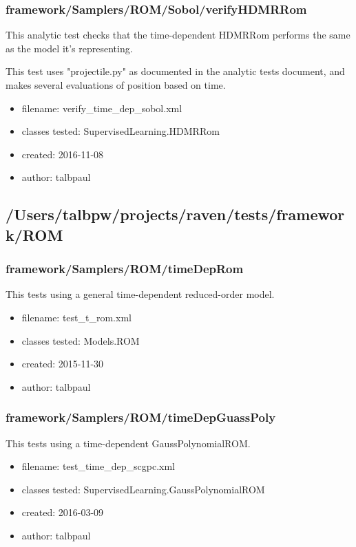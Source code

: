     \subsubsection{framework/Samplers/ROM/Sobol/verifyHDMRRom}
      
      This analytic test checks that the time-dependent HDMRRom performs the same as the model it's representing.
    

      
      This test uses "projectile.py" as documented in the analytic tests document, and makes several evaluations
      of position based on time.
    
      \begin{itemize}
          \item filename: verify\_time\_dep\_sobol.xml
          \item classes tested: SupervisedLearning.HDMRRom
          \item created: 2016-11-08
          \item author: talbpaul
      \end{itemize}
  \subsection{/Users/talbpw/projects/raven/tests/framework/ROM}
    \subsubsection{framework/Samplers/ROM/timeDepRom}
      
      This tests using a general time-dependent reduced-order model.
    
      \begin{itemize}
          \item filename: test\_t\_rom.xml
          \item classes tested: Models.ROM
          \item created: 2015-11-30
          \item author: talbpaul
      \end{itemize}
    \subsubsection{framework/Samplers/ROM/timeDepGuassPoly}
      
      This tests using a time-dependent GaussPolynomialROM.
    
      \begin{itemize}
          \item filename: test\_time\_dep\_scgpc.xml
          \item classes tested: SupervisedLearning.GaussPolynomialROM
          \item created: 2016-03-09
          \item author: talbpaul
      \end{itemize}
